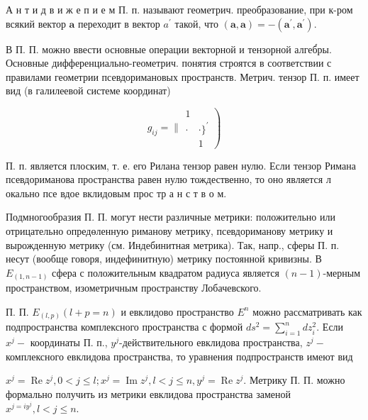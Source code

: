 \documentclass[10pt]{article}
\begin{document}
А н т и д в и ж е п и е м П. п. называют геометрич. преобразование, при к-ром всякий вектор $\boldsymbol{a}$ переходит в вектор $a^{\prime}$ такой, что $(\boldsymbol{a}, \boldsymbol{a})=-\left(\boldsymbol{a}^{\prime}, \boldsymbol{a}^{\prime}\right)$.



В П. П. можно ввести основные операции векторной и тензорной алгеб́ры. Основные дифференциально-геометрич. понятия строятся в соответствии с правилами геометрии псевдоримановых пространств. Метрич. тензор П. п. имеет вид (в галилеевой системе координат)



\[

\left.g_{i j}=\| \begin{array}{cc}

1 & \\

\cdot & \cdot\}^{\prime} \\

& 1

\end{array}\right)

\]



П. п. является плоским, т. е. его Рилана тензор равен нулю. Если тензор Римана псевдориманова пространства равен нулю тождественно, то оно является л окально псе вдое вклидовым прос тр а н с т в о м.



Подмногообразия П. П. могут нести различные метрики: положительно или отрицательно опредөленную риманову метрику, псевдориманову метрику и вырожденную метрику (см. Индебинитная метрика). Так, напр., сферы П. п. несут (вообще говоря, индефинитную) метрику постоянной кривизны. В $E_{(1, n-1)}$ сфера с положительным квадратом радиуса является $(n-1)$-мерным пространством, изометричным пространству Лобачевского.



П. П. $E_{(l, p)}(l+p=n)$ и евклидово пространство $E^{n}$ можно рассматривать как подпространства комплексного пространства с формой $d s^{2}=\sum_{i=1}^{n} d z_{i}^{2}$. Если $x^{j}-$ координаты П. п., $y^{j}$-действительного евклидова пространства, $z^{j}-$ комплексного евклидова пространства, то уравнения подпространств имеют вид



$x^{j}=\operatorname{Re} z^{j}, 0<j \leqslant l ; x^{j}=\operatorname{Im} z^{j}, l<j \leqslant n, y^{j}=\operatorname{Re} z^{j}$. Метрику П. П. можно формально получить из метрики евклидова пространства заменой $x^{j=i y^{j}}, l<j \leqslant n$.
\end{document}
